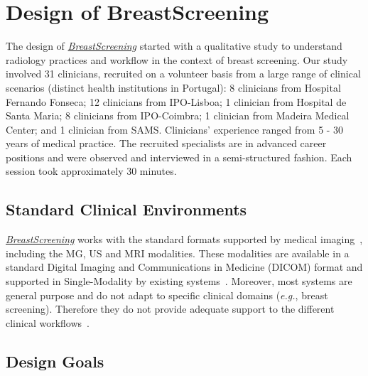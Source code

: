 \section{Design of BreastScreening}
\label{sec:sec003}

The design of \hyperlink{https://breastscreening.github.io/}{{\it BreastScreening}} started with a qualitative study to understand radiology practices and workflow in the context of breast screening.
Our study involved 31 clinicians, recruited on a volunteer basis from a large range of clinical scenarios (distinct health institutions in Portugal):
8 clinicians from Hospital Fernando Fonseca; %
12 clinicians from IPO-Lisboa; %
1 clinician from Hospital de Santa Maria; %
8 clinicians from IPO-Coimbra; %
1 clinician from Madeira Medical Center; and %
1 clinician from SAMS. %
Clinicians' experience ranged from 5 - 30 years of medical practice.
The recruited specialists are in advanced career positions and were observed and interviewed in a semi-structured fashion.
Each session took approximately 30 minutes.

\subsection{Standard Clinical Environments}

\hyperlink{https://breastscreening.github.io/}{{\it BreastScreening}} works with the standard formats supported by medical imaging~\cite{ng2017technical}, including the MG, US and MRI modalities.
These modalities are available in a standard  Digital Imaging and Communications in Medicine (DICOM) format and supported in Single-Modality by existing systems~\cite{henriksen2018efficacy}. Moreover, most systems are general purpose and do not adapt to specific clinical domains ({\it e.g.}, breast screening). Therefore they do not provide adequate support to the different clinical workflows~\cite{Calisto:2017:TTM:3132272.3134111}.

\subsection{Design Goals}

